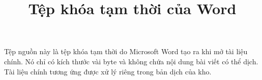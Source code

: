 \documentclass[11pt]{article}
\title{Tệp khóa tạm thời của Word}
\author{}
\date{}
\begin{document}
\maketitle


Tệp nguồn này là tệp khóa tạm thời do Microsoft Word tạo ra khi mở tài liệu
chính. Nó chỉ có kích thước vài byte và không chứa nội dung bài viết có thể
dịch. Tài liệu chính tương ứng được xử lý riêng trong bản dịch của kho.
\end{document}
